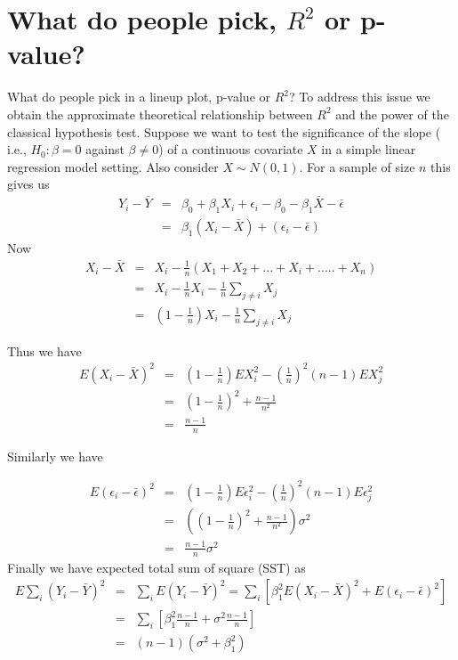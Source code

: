 \documentclass{article}
\begin{document}
\section{What do people pick, $R^2$ or p-value?} What do people pick in a lineup plot, p-value or $R^2$? To address this issue we obtain the approximate theoretical relationship between $R^2$ and the power of the classical hypothesis test. Suppose we want to test the significance of the slope ( i.e.,  $H_0: \beta=0$ against $\beta \ne 0$) of a continuous covariate $X$ in  a simple linear regression model setting. Also consider $X \sim N(0,1)$. For a sample of size $n$ this gives us 
\begin{eqnarray*}
Y_i-\bar{Y}& = & \beta_0+\beta_1X_i+\epsilon_i - \beta_0 - \beta_1 \bar{X}- \bar{\epsilon} \\
          & = & \beta_1(X_i-\bar{X})+(\epsilon_i-\bar{\epsilon})
\end{eqnarray*}
Now 
\begin{eqnarray*}
X_i-\bar{X}& = & X_i - \frac1n (X_1 + X_2 + ... + X_i + .....+ X_n) \\
          & = & X_i - \frac1n X_i - \frac1n \sum_{j \neq i}{X_j}\\
          & = & (1-\frac1n)X_i - \frac1n \sum_{j \neq i}{X_j}
\end{eqnarray*}

Thus we have 
\begin{eqnarray*}
E(X_i-\bar{X})^2 & = & (1-\frac1n)EX_i^2 - \left( \frac1n \right )^2 (n-1) EX_j^2 \\
                 & = & (1-\frac1n)^2+ \frac{n-1}{n^2}\\
                 & = & \frac{n-1}{n}
\end{eqnarray*}

Similarly we have 

\begin{eqnarray*}
E(\epsilon_i-\bar{\epsilon})^2 & = & (1-\frac1n)E\epsilon_i^2 - \left( \frac1n \right )^2 (n-1) E\epsilon_j^2 \\
                 & = & \left((1-\frac1n)^2+ \frac{n-1}{n^2} \right) \sigma^2 \\
                 & = & \frac{n-1}{n}\sigma^2
\end{eqnarray*}
Finally we have expected total sum of square (SST) as
\begin{eqnarray*}
E\sum_i{(Y_i-\bar{Y})^2} & = & \sum_i E(Y_i-\bar{Y})^2=\sum_i \left [ \beta_1^2 E(X_i-\bar{X})^2 + E(\epsilon_i-\bar{\epsilon})^2 \right] \\
                 & = & \sum_i\left[ \beta_1^2 \frac{n-1}{n}+  \sigma^2 \frac{n-1}{n}\right]\\
                 & = & (n-1)(\sigma^2+\beta_1^2)
\end{eqnarray*}
\end{document}
